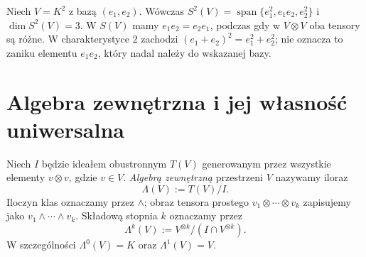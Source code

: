 \begin{przyklad}
\label{prz:lin11-sym2}
Niech \(V=K^2\) z bazą \((e_1,e_2)\).
Wówczas
\(S^2(V)=\operatorname{span}
 \{e_1^2,e_1e_2,e_2^2\}\)
i \(\dim S^2(V)=3\).
W \(S(V)\) mamy \(e_1e_2=e_2e_1\),
podczas gdy w \(V\otimes V\)
oba tensory są różne.
W charakterystyce \(2\)
zachodzi \((e_1+e_2)^2=e_1^2+e_2^2\);
nie oznacza to zaniku
elementu \(e_1e_2\), który
nadal należy do wskazanej bazy.
\end{przyklad}


\section{Algebra zewnętrzna i jej własność uniwersalna}
\label{sec:lin11-zewnetrzna}

\begin{definicja}
\label{def:lin11-zewnetrzna}
Niech \(I\) będzie ideałem
obustronnym \(T(V)\) generowanym przez
wszystkie elementy \(v\otimes v\),
gdzie \(v\in V\).
\emph{Algebrą zewnętrzną} przestrzeni \(V\)
nazywamy iloraz
\[
 \Lambda(V):=T(V)/I.
\]
Iloczyn klas oznaczamy przez \(\wedge\);
obraz tensora prostego
\(v_1\otimes\cdots\otimes v_k\)
zapisujemy jako
\(v_1\wedge\cdots\wedge v_k\).
Składową stopnia \(k\) oznaczamy przez
\[
 \Lambda^k(V):=
 V^{\otimes k}/(I\cap V^{\otimes k}).
\]
W szczególności
\(\Lambda^0(V)=K\) oraz \(\Lambda^1(V)=V\).
\end{definicja}

